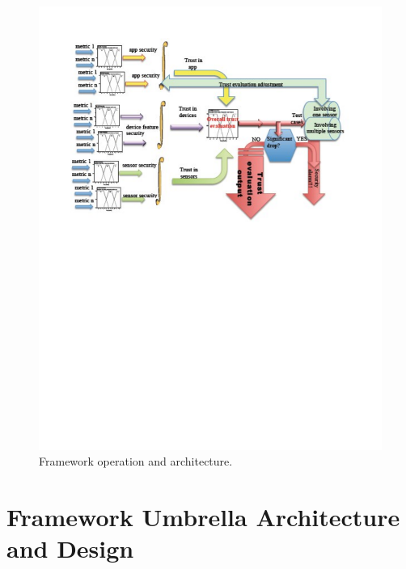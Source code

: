 \begin{figure}[ht]
\centering
\includegraphics[width=5in]{umbrella_framework.pdf}
\caption{Framework operation and architecture.}
\label{fig:umbrella}
\end{figure}

\section{Framework Umbrella Architecture and Design}

